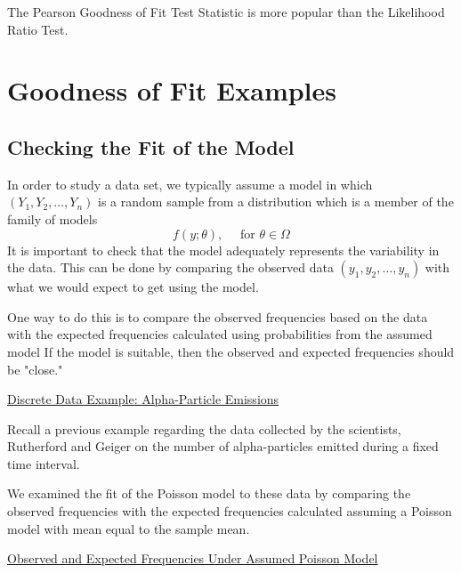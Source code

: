 The Pearson Goodness of Fit Test Statistic is more popular than the Likelihood Ratio Test.

\section{Goodness of Fit Examples}
\subsection{Checking the Fit of the Model}
In order to study a data set, we typically assume a model in which $\left(Y_{1}, Y_{2}, \ldots, Y_{n}\right)$ is a random sample from a distribution which is a member of the family of models
\[
    f(y ; \theta), \quad \text { for } \theta \in \Omega
\]
It is important to check that the model adequately represents the variability in the data.
This can be done by comparing the observed data $\left(y_{1}, y_{2}, \ldots, y_{n}\right)$ with what we would expect to get using the model.

One way to do this is to compare the observed frequencies based on the data with the expected frequencies calculated using probabilities from the assumed model
If the model is suitable, then the observed and expected frequencies should be "close."

\underline{Discrete Data Example: Alpha-Particle Emissions}

Recall a previous example regarding the data collected by the scientists, Rutherford and Geiger on the number of alpha-particles emitted during a fixed time interval.

We examined the fit of the Poisson model to these data by comparing the observed frequencies with the expected frequencies calculated assuming a Poisson model with mean equal to the sample mean.

\underline{Observed and Expected Frequencies Under Assumed Poisson Model}

